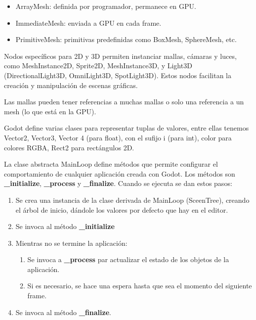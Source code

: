 \documentclass[12pt]{book} %
\providecommand{\tightlist}{%
  \setlength{\itemsep}{0pt}\setlength{\parskip}{0pt}}
\begin{document}
\begin{itemize}
\tightlist
\item
  ArrayMesh: definida por programador, permanece en GPU.
\item
  ImmediateMesh: enviada a GPU en cada frame.
\item
  PrimitiveMesh: primitivas predefinidas como BoxMesh, SphereMesh, etc.
\end{itemize}

Nodos específicos para 2D y 3D permiten instanciar mallas, cámaras y
luces, como MeshInstance2D, Sprite2D, MeshInstance3D, y Light3D
(DirectionalLight3D, OmniLight3D, SpotLight3D). Estos nodos facilitan la
creación y manipulación de escenas gráficas.

Las mallas pueden tener referencias a muchas mallas o solo una
referencia a un mesh (lo que está en la GPU).

Godot define varias clases para representar tuplas de valores, entre
ellas tenemos Vector2, Vector3, Vector 4 (para float), con el sufijo i
(para int), color para colores RGBA, Rect2 para rectángulos 2D.

La clase abstracta MainLoop define métodos que permite configurar el
comportamiento de cualquier aplicación creada con Godot. Los métodos son
\textbf{\_initialize}, \textbf{\_process} y \textbf{\_finalize}. Cuando
se ejecuta se dan estos pasos:

\begin{enumerate}
\def\labelenumi{\arabic{enumi}.}
\tightlist
\item
  Se crea una instancia de la clase derivada de MainLoop (SceenTree),
  creando el árbol de inicio, dándole los valores por defecto que hay en
  el editor.
\item
  Se invoca al método \textbf{\_initialize}
\item
  Mientras no se termine la aplicación:

  \begin{enumerate}
  \def\labelenumii{\arabic{enumii}.}
  \tightlist
  \item
    Se invoca a \textbf{\_process} par actualizar el estado de los
    objetos de la aplicación.
  \item
    Si es necesario, se hace una espera hasta que sea el momento del
    siguiente frame.
  \end{enumerate}
\item
  Se invoca al método \textbf{\_finalize}.
\end{enumerate}
\end{document}
